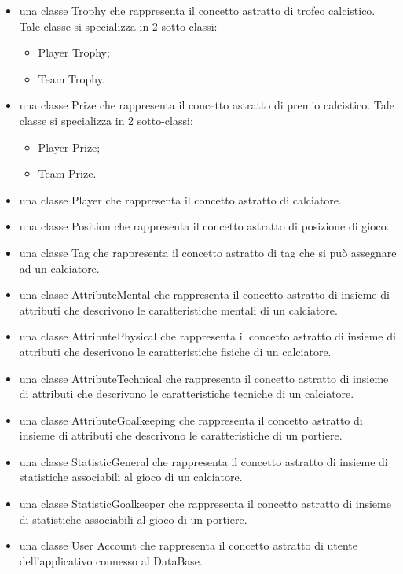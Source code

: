 \begin{itemize}
	\item una classe Trophy che rappresenta il concetto astratto di trofeo calcistico.
		Tale classe si specializza in 2 sotto-classi:
		\begin{itemize}
			\item Player Trophy;
			\item Team Trophy.
		\end{itemize}

	\item una classe Prize che rappresenta il concetto astratto di premio calcistico.
		Tale classe si specializza in 2 sotto-classi:	
		\begin{itemize}
			\item Player Prize;
			\item Team Prize.
		\end{itemize}	

	\item una classe Player che rappresenta il concetto astratto di calciatore.

	\item una classe Position che rappresenta il concetto astratto di posizione di gioco.

	\item una classe Tag che rappresenta il concetto astratto di tag che si può assegnare
		ad un calciatore.

	\item una classe AttributeMental che rappresenta il concetto astratto di insieme di
		attributi che descrivono le caratteristiche mentali di un calciatore.
			
	\item una classe AttributePhysical che rappresenta il concetto astratto di insieme di
		attributi che descrivono le caratteristiche fisiche di un calciatore.
	
	\item una classe AttributeTechnical che rappresenta il concetto astratto di insieme di
		attributi che descrivono le caratteristiche tecniche di un calciatore.
	
	\item una classe AttributeGoalkeeping che rappresenta il concetto astratto di insieme di
		attributi che descrivono le caratteristiche di un portiere.

	\item una classe StatisticGeneral che rappresenta il concetto astratto di insieme di
		statistiche associabili al gioco di un calciatore.
		
	\item una classe StatisticGoalkeeper che rappresenta il concetto astratto di insieme di
		statistiche associabili al gioco di un portiere.

	\item una classe User Account che rappresenta il concetto astratto di utente dell'applicativo
		connesso al DataBase.
		
\end{itemize}

